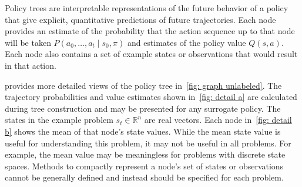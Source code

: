\documentclass[letterpaper]{article} %
\begin{document}
Policy trees are interpretable representations of the future behavior of a policy that give explicit, quantitative predictions of future trajectories.
Each node provides an estimate of the probability that the action sequence up to that node will be taken $P(a_0, \dots, a_t \mid s_0, \pi)$ and estimates of the policy value $Q(s, a)$.
Each node also contains a set of example states or observations that would result in that action. 

 provides more detailed views of the policy tree in~\cref{fig: graph unlabeled}.
The trajectory probabilities and value estimates shown in~\cref{fig: detail a} are calculated during tree construction and may be presented for any surrogate policy.
The states in the example problem $s_t \in \mathbb{R}^{n}$ are real vectors. 
Each node in~\cref{fig: detail b} shows the mean of that node's state values.
While the mean state value is useful for understanding this problem, it may not be useful in all problems.
For example, the mean value may be meaningless for problems with discrete state spaces.
Methods to compactly represent a node's set of states or observations cannot be generally defined and instead should be specified for each problem. 
\end{document}
